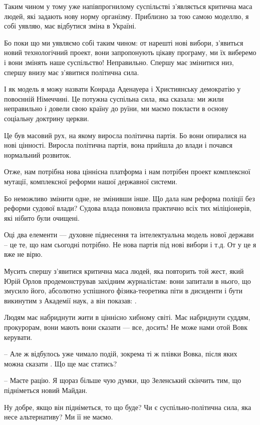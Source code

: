 Таким чином у тому уже напівпрогнилому суспільстві з’являється критична маса
людей, які задають нову норму організму. Приблизно за тою самою моделлю, я собі
уявляю, має відбутися зміна в Україні. 

Бо поки що ми уявляємо собі таким чином: от нарешті нові вибори, з’явиться
новий технологічний проект, вони запропонують цікаву програму, ми їх виберемо і
вони змінять наше суспільство! Неправильно. Спершу має змінитися низ, спершу
внизу має з’явитися політична сила. 

І як модель я можу назвати Конрада Аденауера і Християнську демократію у
повоєнній Німеччині. Це потужна суспільна сила, яка сказала: ми жили
неправильно і довели свою країну до руїни, ми маємо покласти в основу соціальну
доктрину церкви. 

Це був масовий рух, на якому виросла політична партія. Бо вони опиралися на
нові цінності. Виросла політична партія, вона прийшла до влади і почався
нормальний розвиток. 

Отже, нам потрібна нова ціннісна платформа і нам потрібен проект комплексної
мутації, комплексної реформи нашої державної системи. 

Бо неможливо змінити одне, не змінивши інше. Що дала нам реформа поліції без
реформи судової влади? Судова влада поновила практично всіх тих міліціонерів,
які нібито були очищені. 

Оці два елементи --- духовне піднесення та інтелектуальна модель нової держави –
це те, що нам сьогодні потрібно. Не нова партія під нові вибори і т.д. От у це
я вже не вірю. 

Мусить спершу з’явитися критична маса людей, яка повторить той жест, який Юрій
Орлов продемонстрував західним журналістам: вони запитали в нього, що змусило
його, абсолютно успішного фізика-теоретика піти в дисиденти і бути викинутим з
Академії наук, а він показав: . 

Людям має набриднути жити в ціннісно хибному світі. Має набриднути суддям,
прокурорам, вони мають вони сказати --- все, досить! Не може нами отой Вовк
керувати.

– Але ж відбулось уже чимало подій, зокрема ті ж плівки Вовка, після яких можна
сказати . Що ще має статись?

– Маєте рацію. Я щораз більше чую думки, що Зеленський скінчить тим, що
підніметься новий Майдан. 

Ну добре, якщо він підніметься, то що буде? Чи є суспільно-політична сила, яка
несе альтернативу? Ми її не маємо. 

